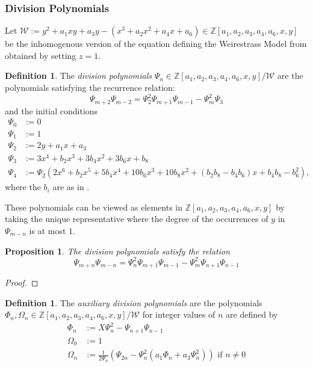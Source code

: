 \documentclass[a4paper,12pt,reqno]{amsart}
\newcommand{\field}[1]{\mathbb{#1}}  %
\newcommand{\Z}{\field{Z}} %
\newtheorem{proposition}[lemma]{Proposition}
\theoremstyle{definition}
\newtheorem{definition}[lemma]{Definition}
\numberwithin{lemma}{section}
\numberwithin{equation}{section}
\numberwithin{figure}{section}
\begin{document}
\subsubsection{Division Polynomials}
\hspace{1em}

Let $\mathcal W := y^2+ a_1xy+a_3y-(x^3+a_2x^2+a_4x+a_6) \in \Z[a_1,a_2,a_3,a_4,a_6,x,y]$ be the inhomogenous version of the equation defining the Weirestrass Model from   obtained by setting $z=1$.

\begin{definition}
The \textit{division polynomials} $\Psi_n \in \Z[a_1,a_2,a_3,a_4,a_6,x,y]/\mathcal W$ are the polynomials satisfying  the recurrence relation:
\[\Psi_{m+2}\Psi_{m-2}=\Psi_2^2\Psi_{m+1}\Psi_{m-1}-\Psi_m^2\Psi_{3}\]
and the initial conditions
\begin{align*}
\Psi_0 & := 0 \\
\Psi_1 & := 1 \\
\Psi_2 & := 2y+a_1x+a_3 \\
\Psi_3 & := 3x^4+b_2x^3+3b_4x^2+3b_6x+b_8 \\
\Psi_4 & := \Psi_2(2x^6+b_2x^5+5b_4x^4+10b_6x^3+10b_8x^2+(b_2b_8-b_4b_6)x + b_4b_8-b_6^2),
\end{align*}
where the $b_i$ are as in .
\end{definition}

These polynomials can be viewed as elements in $\Z[a_1,a_2,a_3,a_4,a_6,x,y]$ by taking the unique representative where the degree of the occurrences of  $y$ in $\Psi_{m-n}$ is at most $1$.

\begin{proposition}
The division polynomials satisfy the relation \[\Psi_{m+n}\Psi_{m-n}=\Psi_n^2\Psi_{m+1}\Psi_{m-1}-\Psi_m^2\Psi_{n+1}\Psi_{n-1}\]
\end{proposition}
\begin{proof}
\end{proof}

\begin{definition}The \textit{auxiliary division polynomials} are the polynomials $\Phi_n,\Omega_n \in \Z[a_1,a_2,a_3,a_4,a_6,x,y]/\mathcal W$ for integer values of $n$ are defined by
	\begin{align*}
	   \Phi_n & := X\Psi_n^2-\Psi_{n+1}\Psi_{n-1} \\
	   \Omega_0 & := 1 \\
	   \Omega_n & := \frac{1}{2\Psi_n}(\Psi_{2n}-\Psi^2_n(a_1\Phi_n+a_3\Psi_n^2)) \text{ if } n\neq 0
	\end{align*}
\end{definition}
\end{document}
